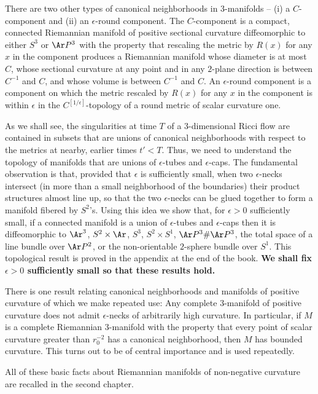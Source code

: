 There are two other types of canonical neighborhoods in
$3$-manifolds -- (i) a $C$-component and (ii)
an $\epsilon$-round component. The
$C$-component is a compact, connected Riemannian manifold of
positive sectional curvature diffeomorphic to either $S^3$ or $\Ar
P^3$ with the property that rescaling  the metric by $R(x)$ for any
$x$ in the component produces a Riemannian manifold whose  diameter
 is at most $C$, whose sectional curvature at any point and in any
$2$-plane direction is between $C^{-1}$ and $C$, and whose volume is
between $C^{-1}$ and $C$. An $\epsilon$-round component is a
component on which the metric rescaled by $R(x)$ for any $x$ in the
component is within $\epsilon$ in the $C^{[1/\epsilon]}$-topology of
a round metric of scalar curvature one.

As we shall see, the singularities at time $T$ of a $3$-dimensional
Ricci flow are contained in subsets that are unions of canonical
neighborhoods with respect to the metrics at nearby, earlier times
$t'<T$. Thus, we need to understand the topology of manifolds that
are unions of $\epsilon$-tubes and $\epsilon$-caps. The fundamental
observation is that, provided that $\epsilon$ is sufficiently small,
when two $\epsilon$-necks intersect (in more than a small
neighborhood of the boundaries) their product structures almost line
up, so that the two $\epsilon$-necks can be glued together to form a
manifold fibered by $S^2$'s. Using this idea we show that, for
$\epsilon>0$ sufficiently small, if a connected manifold is a union
of $\epsilon$-tubes and $\epsilon$-caps  then it is diffeomorphic to
$\Ar^3$,  $S^2\times \Ar$, $S^3$, $S^2\times S^1$, $\Ar P^3\#\Ar
P^3$,  the total space of a line bundle over $\Ar P^2$, or  the
non-orientable $2$-sphere bundle over $S^1$. This topological result
is proved in the appendix at the end of the book. {\bf We shall fix
$\epsilon>0$ sufficiently small so that these results hold.}

There is one result relating canonical neighborhoods and manifolds
of positive curvature of which we make repeated use: Any complete
$3$-manifold of positive curvature does not admit $\epsilon$-necks
of arbitrarily high curvature. In particular, if $M$ is a complete
Riemannian $3$-manifold with the property that every point of scalar
curvature greater than $r_0^{-2}$ has a canonical neighborhood, then
$M$ has bounded curvature. This turns out to be of central
importance and is used repeatedly.

All of these basic facts about Riemannian manifolds of non-negative
curvature are recalled in the second chapter.

